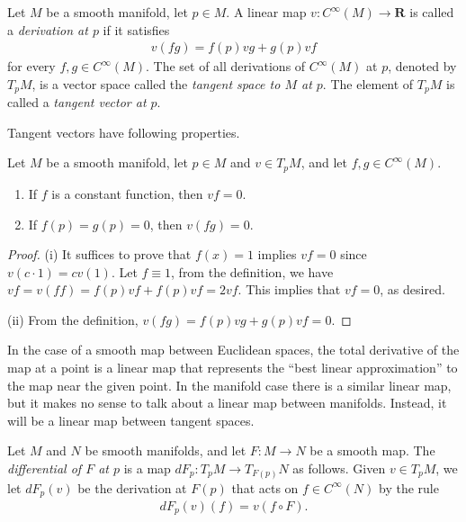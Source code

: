 \begin{definition}
    Let $M$ be a smooth manifold, let $p \in M$. A linear map $v : C^\infty(M) \to \mathbf{R}$  is called a \emph{derivation at $p$} if it satisfies
    \begin{align*}
        v(fg) = f(p)vg + g(p)vf
    \end{align*}
for every $f,g \in C^\infty(M)$. The set of all derivations of $C^\infty(M)$ at $p$, denoted by $T_pM$, is a vector space called the \emph{tangent space to $M$ at $p$}. The element of $T_pM$ is called a \emph{tangent vector at $p$}.
\end{definition}

Tangent vectors have following properties.

\begin{lemma}
    Let $M$ be a smooth manifold, let $p \in M$ and $v \in T_pM$, and let $f, g \in C^\infty(M)$.
    \begin{enumerate}
        \item If $f$ is a constant function, then $vf = 0$.
        \item If $f(p) = g(p) = 0$, then $v(fg) = 0$.
    \end{enumerate}
\end{lemma}

\begin{proof}
    (i) It suffices to prove that $f(x) = 1$ implies $vf = 0$ since $v(c \cdot 1) = cv(1)$. Let $f \equiv 1$, from the definition, we have $vf = v(ff) = f(p)vf + f(p)vf = 2vf$. This implies that $vf = 0$, as desired.

    (ii) From the definition, $v(fg) = f(p)vg + g(p)vf = 0$.
\end{proof}

In the case of a smooth map between Euclidean spaces, the total derivative of the map at a point is a linear map that represents the ``best linear approximation'' to the map near the given point. In the manifold case there is a similar linear map, but it makes no sense to talk about a linear map between manifolds. Instead, it will be a linear map between tangent spaces.

\begin{definition}[Differential]
    Let $M$ and $N$ be smooth manifolds, and let $F : M \to N$ be a smooth map. The \emph{differential of $F$ at $p$} is a map $dF_p : T_pM \to T_{F(p)}N$ as follows. Given $v \in T_pM$, we let $dF_p(v)$ be the derivation at $F(p)$ that acts on $f \in C^\infty(N)$ by the rule
    \begin{align*}
        dF_p(v)(f) = v(f \circ F).
    \end{align*}
\end{definition}


